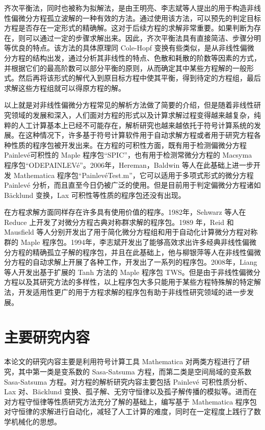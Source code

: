 齐次平衡法，同时也被称为拟解法，是由王明亮、李志斌等人提出的用于构造非线性偏微分方程孤立波解的一种有效的方法。通过使用该方法，可以预先的判定目标方程是否存在一定形式的精确解。这对于后续方程的求解非常重要。如果判断为存在，则可以通过一定的步骤求解出来。因此，齐次平衡法具有直接简洁、步骤分明等优良的特点。该方法的具体原理同 Cole-Hopf 变换有些类似，是从非线性偏微分方程的结构出发，通过分析其非线性的特点、色散和耗散的阶数等因素的方式，并根据它们的最高阶数可以部分平衡的原则，从而确定其中某些方程解的一般形式。然后再将该形式的解代入到原目标方程中使其平衡，得到待定的方程组，最后求解这些方程组就可以得原方程的解。

以上就是对非线性偏微分方程常见的解析方法做了简要的介绍，但是随着非线性研究领域的发展和深入，人们面对方程的形式以及计算求解过程变得越来越复杂，纯粹的人工计算基本上已经不可能存在，解析研究也越来越依托于符号计算系统的发展。在这种情况下，许多基于符号计算软件用于自动求解方程或者用于研究方程各种性质的程序包被开发出来。在方程的可积性方面，既有用于检测偏微分方程 Painlev\'{e}可积性的 Maple 程序包“SPIC”，也有用于检测常微分方程的  Macsyma 程序包“ODEPAINLEV\'{e}”。2006年，Hereman，Baldwin 等人在此基础上进一步开发  Mathematica 程序包“Painlev\'{e}Test.m”，它可以适用于多项式形式的微分方程 Painlev\'{e} 分析，而且直至今日仍被广泛的使用。但是目前用于判定偏微分方程诸如 B\"{a}cklund 变换，Lax 可积性等性质的程序包还没有出现。

在方程求解方面同样存在许多具有使用价值的程序。1982年，Sehwarz 等人在 Reduce 上开发了对微分方程古典对称群求解的程序包。1989 年，Reid 和 Mausfield 等人分别开发出了用于简化微分方程组和用于自动化计算微分方程对称群的  Maple 程序包。1994年，李志斌开发出了能够高效求出许多经典非线性偏微分方程的精确孤立子解的程序包，并且在此基础上，他与柳银萍等人在非线性偏微分方程的自动求解上开展了各种工作，开发出了一系列的程序包。2008年，Liang 等人开发出基于扩展的 Tanh 方法的 Maple 程序包 TWS。但是由于非线性偏微分方程以及其研究方法的多样性，以上程序包大多只能用于某些方程特殊解的特定解法，开发适用性更广的用于方程求解的程序包有助于非线性研究领域的进一步发展。

\section{主要研究内容}

本论文的研究内容主要是利用符号计算工具 Mathematica 对两类方程进行了研究，其中第一类是变系数的 Sasa-Satsuma 方程，而第二类是空间局域的变系数 Sasa-Satsuma 方程。对方程的解析研究内容主要包括  Painlev\'{e} 可积性质分析、Lax 对、B\"{a}cklund 变换、孤子解、无穷守恒律以及孤子解传播的模拟等。进而在对方程守恒律等性质研究方法充分了解的基础上，编写基于 Mathematica 程序包对守恒律的求解进行自动化，减轻了人工计算的难度，同时在一定程度上践行了数学机械化的思想。

